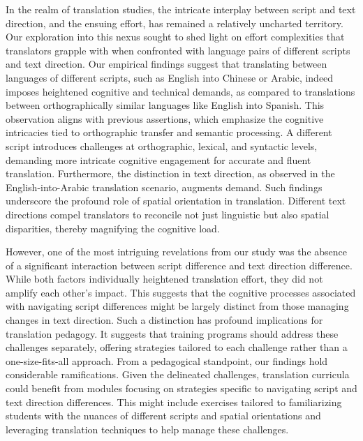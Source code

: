 \documentclass[output=paper]{langscibook}
\begin{document}
In the realm of translation studies, the intricate interplay between script and text direction, and the ensuing effort, has remained a relatively uncharted territory. Our exploration into this nexus sought to shed light on effort complexities that translators grapple with when confronted with language pairs of different scripts and text direction. Our empirical findings suggest that translating between languages of different scripts, such as English into Chinese or Arabic, indeed imposes heightened cognitive and technical demands, as compared to translations between orthographically similar languages like English into Spanish. This observation aligns with previous assertions, which emphasize the cognitive intricacies tied to orthographic transfer and semantic processing. A different script introduces challenges at orthographic, lexical, and syntactic levels, demanding more intricate cognitive engagement for accurate and fluent translation. Furthermore, the distinction in text direction, as observed in the English-into-Arabic translation scenario, augments demand. Such findings underscore the profound role of spatial orientation in translation. Different text directions compel translators to reconcile not just linguistic but also spatial disparities, thereby magnifying the cognitive load.

However, one of the most intriguing revelations from our study was the absence of a significant interaction between script difference and text direction difference. While both factors individually heightened translation effort, they did not amplify each other’s impact. This suggests that the cognitive processes associated with navigating script differences might be largely distinct from those managing changes in text direction. Such a distinction has profound implications for translation pedagogy. It suggests that training programs should address these challenges separately, offering strategies tailored to each challenge rather than a one-size-fits-all approach. From a pedagogical standpoint, our findings hold considerable ramifications. Given the delineated challenges, translation curricula could benefit from modules focusing on strategies specific to navigating script and text direction differences. This might include exercises tailored to familiarizing students with the nuances of different scripts and spatial orientations and leveraging translation techniques to help manage these challenges.
\end{document}
